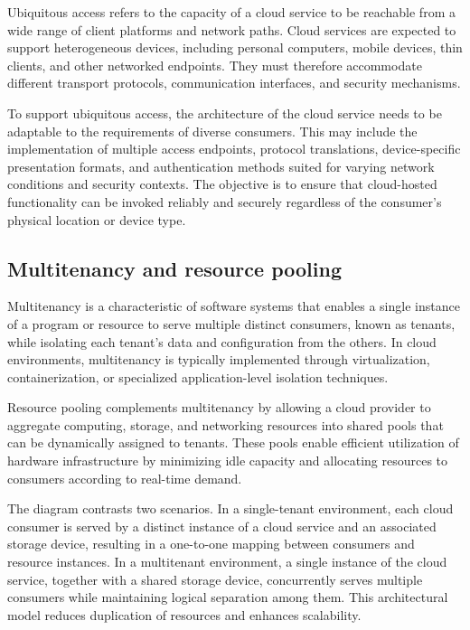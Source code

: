 \documentclass[11pt,a4paper,openany]{report}
\begin{document}
Ubiquitous access refers to the capacity of a cloud service to be reachable from a wide range of client platforms and network paths. Cloud services are expected to support heterogeneous devices, including personal computers, mobile devices, thin clients, and other networked endpoints. They must therefore accommodate different transport protocols, communication interfaces, and security mechanisms.

To support ubiquitous access, the architecture of the cloud service needs to be adaptable to the requirements of diverse consumers. This may include the implementation of multiple access endpoints, protocol translations, device-specific presentation formats, and authentication methods suited for varying network conditions and security contexts. The objective is to ensure that cloud-hosted functionality can be invoked reliably and securely regardless of the consumer's physical location or device type.

\subsection{Multitenancy and resource pooling}

Multitenancy is a characteristic of software systems that enables a single instance of a program or resource to serve multiple distinct consumers, known as tenants, while isolating each tenant's data and configuration from the others. In cloud environments, multitenancy is typically implemented through virtualization, containerization, or specialized application-level isolation techniques.

Resource pooling complements multitenancy by allowing a cloud provider to aggregate computing, storage, and networking resources into shared pools that can be dynamically assigned to tenants. These pools enable efficient utilization of hardware infrastructure by minimizing idle capacity and allocating resources to consumers according to real-time demand.

The diagram contrasts two scenarios. In a single-tenant environment, each cloud consumer is served by a distinct instance of a cloud service and an associated storage device, resulting in a one-to-one mapping between consumers and resource instances. In a multitenant environment, a single instance of the cloud service, together with a shared storage device, concurrently serves multiple consumers while maintaining logical separation among them. This architectural model reduces duplication of resources and enhances scalability.
\end{document}
